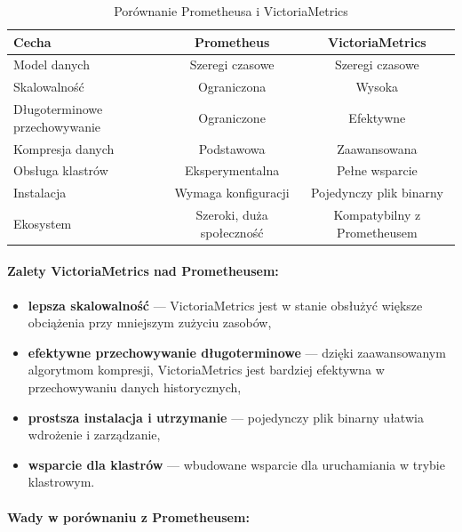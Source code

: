 \documentclass{article}
\begin{document}
\begin{table}[H]
    \centering
    \begin{tabular}{|l|c|c|}
        \hline
        \textbf{Cecha} & \textbf{Prometheus} & \textbf{VictoriaMetrics} \\ \hline
        Model danych & Szeregi czasowe & Szeregi czasowe \\ \hline
        Skalowalność & Ograniczona & Wysoka \\ \hline
        Długoterminowe przechowywanie & Ograniczone & Efektywne \\ \hline
        Kompresja danych & Podstawowa & Zaawansowana \\ \hline
        Obsługa klastrów & Eksperymentalna & Pełne wsparcie \\ \hline
        Instalacja & Wymaga konfiguracji & Pojedynczy plik binarny \\ \hline
        Ekosystem & Szeroki, duża społeczność & Kompatybilny z Prometheusem \\ \hline
    \end{tabular}
    \caption{Porównanie Prometheusa i VictoriaMetrics}
    \label{tab:porownanie-prometheus-victoriametrics}
\end{table}

\paragraph{Zalety VictoriaMetrics nad Prometheusem:}

\begin{itemize}
    \item \textbf{lepsza skalowalność} — VictoriaMetrics jest w stanie obsłużyć większe obciążenia przy mniejszym zużyciu zasobów,
    \item \textbf{efektywne przechowywanie długoterminowe} — dzięki zaawansowanym algorytmom kompresji, VictoriaMetrics jest bardziej efektywna w przechowywaniu danych historycznych,
    \item \textbf{prostsza instalacja i utrzymanie} — pojedynczy plik binarny ułatwia wdrożenie i zarządzanie,
    \item \textbf{wsparcie dla klastrów} — wbudowane wsparcie dla uruchamiania w trybie klastrowym.
\end{itemize}

\paragraph{Wady w porównaniu z Prometheusem:}
\end{document}
